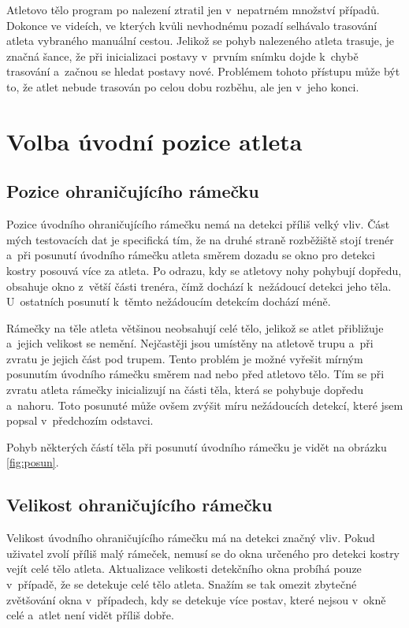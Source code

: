 Atletovo tělo program po nalezení ztratil jen v~nepatrném množství případů. Dokonce ve videích, ve kterých kvůli nevhodnému pozadí selhávalo trasování atleta vybraného manuální cestou. Jelikož se pohyb nalezeného atleta trasuje, je značná šance, že při inicializaci postavy v~prvním snímku dojde k~chybě trasování a~začnou se hledat postavy nové. Problémem tohoto přístupu může být to, že atlet nebude trasován po celou dobu rozběhu, ale jen v~jeho konci.



\section{Volba úvodní pozice atleta}

\subsection{Pozice ohraničujícího rámečku}

Pozice úvodního ohraničujícího rámečku nemá na detekci příliš velký vliv. Část mých testovacích dat je specifická tím, že na druhé straně rozběžiště stojí trenér a~při posunutí úvodního rámečku atleta směrem dozadu se okno pro detekci kostry posouvá více za atleta. Po odrazu, kdy se atletovy nohy pohybují dopředu, obsahuje okno z~větší části trenéra, čímž dochází k~nežádoucí detekci jeho těla. U~ostatních posunutí k~těmto nežádoucím detekcím dochází méně.

Rámečky na těle atleta většinou neobsahují celé tělo, jelikož se atlet přibližuje a~jejich velikost se nemění. Nejčastěji jsou umístěny na atletově trupu a~při zvratu je jejich část pod trupem. Tento problém je možné vyřešit mírným posunutím úvodního rámečku směrem nad nebo před atletovo tělo. Tím se při zvratu atleta rámečky inicializují na části těla, která se pohybuje dopředu a~nahoru. Toto posunuté může ovšem zvýšit míru nežádoucích detekcí, které jsem popsal v~předchozím odstavci.

Pohyb některých částí těla při posunutí úvodního rámečku je vidět na obrázku \ref{fig:posun}.



\subsection{Velikost ohraničujícího rámečku}
\label{ssec:velikost}

Velikost úvodního ohraničujícího rámečku má na detekci značný vliv. Pokud uživatel zvolí příliš malý rámeček, nemusí se do okna určeného pro detekci kostry vejít celé tělo atleta. Aktualizace velikosti detekčního okna probíhá pouze v~případě, že se detekuje celé tělo atleta. Snažím se tak omezit zbytečné zvětšování okna v~případech, kdy se detekuje více postav, které nejsou v~okně celé a~atlet není vidět příliš dobře.


